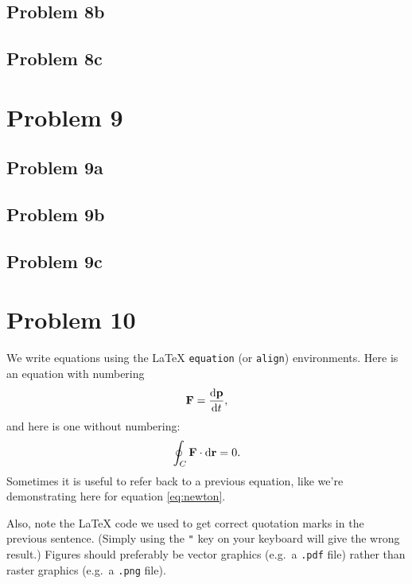 \documentclass[english,notitlepage]{revtex4-1}  %
\begin{document}
\subsection*{Problem 8b}

\subsection*{Problem 8c}


\section*{Problem 9}
\subsection*{Problem 9a}

\subsection*{Problem 9b}

\subsection*{Problem 9c}


\section*{Problem 10}
 

We write equations using the LaTeX \texttt{equation} (or \texttt{align}) environments. Here is an equation with numbering
\begin{equation}\label{eq:newton}
    \vb{F} = \dv{\vb{p}}{t},
\end{equation}
and here is one without numbering:
\begin{equation*}
\oint_C \vb{F}\cdot \dd \vb{r} = 0.
\end{equation*}
Sometimes it is useful to refer back to a previous equation, like we're demonstrating here for equation \ref{eq:newton}.

Also, note the LaTeX code we used to get correct quotation marks in the previous sentence. (Simply using the \texttt{"} key on your keyboard will give the wrong result.) Figures should preferably be vector graphics (e.g.\ a \texttt{.pdf} file) rather than raster graphics (e.g.\ a \texttt{.png} file).
\end{document}
